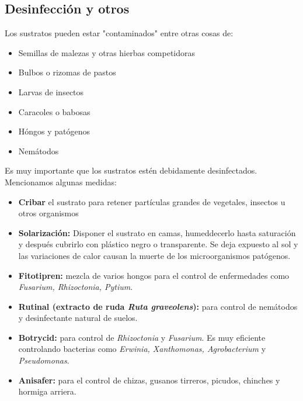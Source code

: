 \documentclass[a4paper,12pt,oneside]{article}
\begin{document}
\subsection{Desinfección y otros}
\label{sec:org297cc02}
Los sustratos pueden estar "contaminados" entre otras cosas de:
\begin{itemize}
\item Semillas de malezas y otras hierbas competidoras
\item Bulbos o rizomas de pastos
\item Larvas de insectos
\item Caracoles o babosas
\item Hóngos y patógenos
\item Nemátodos
\end{itemize}
Es muy importante que los sustratos estén debidamente desinfectados. Mencionamos
algunas medidas:
\begin{itemize}
\item \textbf{Cribar} el sustrato para retener partículas grandes de vegetales, insectos u
otros organismos
\item \textbf{Solarización:} Disponer el sustrato en camas, humeddecerlo hasta saturación y
después cubrirlo con plástico negro o transparente. Se deja expuesto al sol y
las variaciones de calor causan la muerte de los microorganismos patógenos.
\item \textbf{Fitotipren:} mezcla de varios hongos para el control de enfermedades como
\emph{Fusarium, Rhizoctonia, Pytium}.
\item \textbf{Rutinal (extracto de ruda \emph{Ruta graveolens}):} para control de nemátodos y
desinfectante natural de suelos.
\item \textbf{Botrycid:} para control de \emph{Rhizoctonia} y \emph{Fusarium}. Es muy eficiente
controlando bacterias como \emph{Erwinia, Xanthomonas, Agrobacterium} y \emph{Pseudomonas}.
\item \textbf{Anisafer:} para el control de chizas, gusanos tirreros, picudos, chinches y
hormiga arriera.
\end{itemize}
\end{document}
